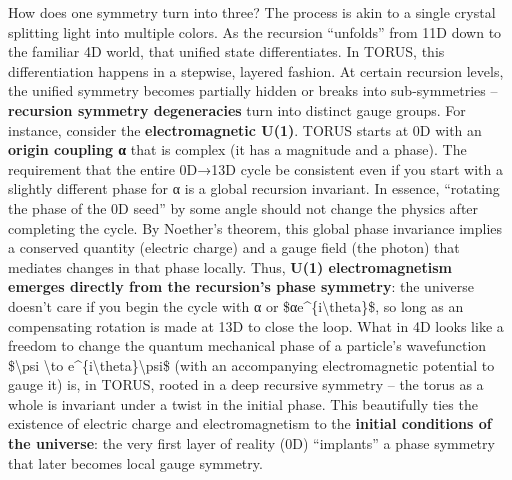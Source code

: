 How does one symmetry turn into three? The process is akin to a single
crystal splitting light into multiple colors. As the recursion
``unfolds'' from 11D down to the familiar 4D world, that unified state
differentiates. In TORUS, this differentiation happens in a stepwise,
layered fashion. At certain recursion levels, the unified symmetry
becomes partially hidden or breaks into sub-symmetries --
\textbf{recursion symmetry degeneracies} turn into distinct gauge
groups. For instance, consider the \textbf{electromagnetic U(1)}. TORUS
starts at 0D with an \textbf{origin coupling α} that is complex (it has
a magnitude and a phase). The requirement that the entire 0D→13D cycle
be consistent even if you start with a slightly different phase for α is
a global recursion invariant. In essence, ``rotating the phase of the 0D
seed'' by some angle should not change the physics after completing the
cycle​. By Noether's theorem, this global phase invariance implies a
conserved quantity (electric charge) and a gauge field (the photon) that
mediates changes in that phase locally. Thus, \textbf{U(1)
electromagnetism emerges directly from the recursion's phase symmetry}:
the universe doesn't care if you begin the cycle with α or
\$αe\^{}\{i\textbackslash{}theta\}\$, so long as an compensating
rotation is made at 13D to close the loop​. What in 4D looks like a
freedom to change the quantum mechanical phase of a particle's
wavefunction \$\textbackslash{}psi \textbackslash{}to
e\^{}\{i\textbackslash{}theta\}\textbackslash{}psi\$ (with an
accompanying electromagnetic potential to gauge it) is, in TORUS, rooted
in a deep recursive symmetry -- the torus as a whole is invariant under
a twist in the initial phase. This beautifully ties the existence of
electric charge and electromagnetism to the \textbf{initial conditions
of the universe}: the very first layer of reality (0D) ``implants'' a
phase symmetry that later becomes local gauge symmetry.

